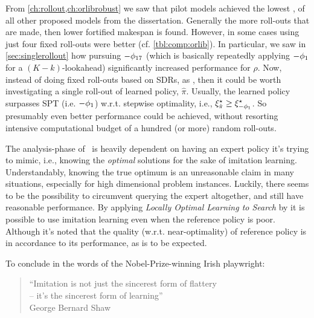 From \cref{ch:rollout,ch:orlibrobust} we saw that pilot models achieved the 
lowest \namerho, of all other proposed models from the dissertation. 
Generally the more roll-outs that are made, then lower fortified makespan is 
found. However, in some cases using just four fixed roll-outs were better (cf. 
\cref{tbl:comp:orlib}). 
In particular, we saw in \cref{sec:singlerollout} how pursuing $-\phi_{17}$ 
(which is basically repeatedly applying $-\phi_1$ for a $(K-k)$-lookahead)  
significantly increased performance for $\rho$.
Now, instead of doing fixed roll-outs based on SDRs, as \phiSDRRelated, then it 
could be worth investigating a single roll-out of learned policy, $\hat{\pi}$. 
Usually, the learned policy surpasses SPT (i.e. $-\phi_1$) w.r.t. stepwise 
optimality, i.e., $\xi^{\star}_{\hat{\pi}}\geq\xi^{\star}_{-\phi_1}$. 
So presumably even better performance could be achieved, without resorting 
intensive computational budget of a hundred (or more) random roll-outs.

The analysis-phase of \Alice\ is heavily dependent on having an expert 
policy it's trying to mimic, i.e., knowing the \emph{optimal} solutions for the 
sake of imitation learning. 
Understandably, knowing the true optimum is an unreasonable claim in many 
situations, especially for high dimensional problem instances. 
Luckily, there seems to be the possibility to circumvent querying the expert 
altogether, and still have reasonable performance. 
By applying \emph{Locally Optimal Learning to Search} by \citet{ChangKADL15} it 
is possible to use imitation learning even when the reference policy is poor. 
Although it's noted that the quality (w.r.t. near-optimality) of reference 
policy is in accordance to its performance, as is to be expected. 

To conclude in the words of the Nobel-Prize-winning Irish playwright:
\begin{quote}
    ``Imitation is not just the sincerest form of flattery \\ -- it's the 
    sincerest form of learning'' \\
    \raggedleft George Bernard Shaw
\end{quote} 